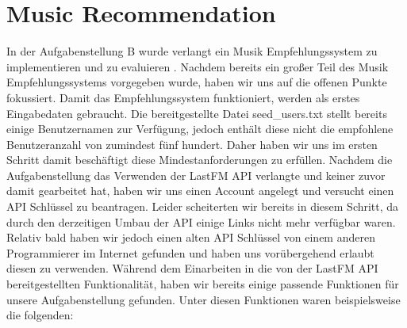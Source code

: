\documentclass[prodmode,acmtecs]{acmsmall} %
\begin{document}
\section{Music Recommendation}
In der Aufgabenstellung B wurde verlangt ein Musik Empfehlungssystem zu implementieren und zu evaluieren \cite{music-recommender}. Nachdem bereits ein großer Teil des Musik Empfehlungssystems vorgegeben wurde, haben wir uns auf die offenen Punkte fokussiert. Damit das Empfehlungssystem funktioniert, werden als erstes Eingabedaten gebraucht. Die bereitgestellte Datei seed\_users.txt stellt bereits einige Benutzernamen zur Verfügung, jedoch enthält diese nicht die empfohlene Benutzeranzahl von zumindest fünf hundert. Daher haben wir uns im ersten Schritt damit beschäftigt diese Mindestanforderungen zu erfüllen. Nachdem die Aufgabenstellung das Verwenden der LastFM API verlangte und keiner zuvor damit gearbeitet hat, haben wir uns einen Account angelegt und versucht einen API Schlüssel zu beantragen. Leider scheiterten wir bereits in diesem Schritt, da durch den derzeitigen Umbau der API einige Links nicht mehr verfügbar waren. Relativ bald haben wir jedoch einen alten API Schlüssel von einem anderen Programmierer im Internet gefunden und haben uns vorübergehend erlaubt diesen zu verwenden. Während dem Einarbeiten in die von der LastFM API bereitgestellten Funktionalität, haben wir bereits einige passende Funktionen für unsere Aufgabenstellung gefunden. Unter diesen Funktionen waren beispielsweise die folgenden:
\end{document}
